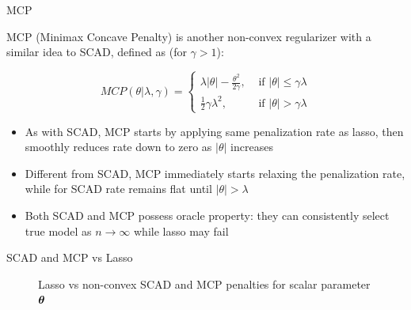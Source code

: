 \documentclass[11pt,compress,t,notes=noshow, xcolor=table]{beamer}
\begin{document}
\begin{vbframe}{MCP }

MCP ({\footnotesize{Minimax Concave Penalty}}) is another non-convex regularizer with a similar idea to SCAD, defined as (for $\gamma>1$):

$$
MCP(\theta | \lambda, \gamma)= \begin{cases}\lambda|\theta|-\frac{\theta^2}{2 \gamma}, & \text { if }|\theta| \leq \gamma \lambda \\ \frac{1}{2} \gamma \lambda^2, & \text { if }|\theta|>\gamma \lambda\end{cases}
$$
\vspace{0.3cm}
\begin{itemize}\setlength{\itemsep}{1.3em}
    \item As with SCAD, MCP starts by applying same penalization rate as lasso, then smoothly reduces rate down to zero as $|\theta|$ increases
    \item Different from SCAD, MCP immediately starts relaxing the penalization rate, while for SCAD rate remains flat until $|\theta|>\lambda$
    \item Both SCAD and MCP possess oracle property: they can consistently select true model as $n \to \infty$ while lasso may fail
\end{itemize}

\end{vbframe}

\begin{vbframe}{SCAD and MCP vs Lasso}

\begin{figure}
      \centering
        \caption{\footnotesize Lasso vs non-convex SCAD and MCP penalties for scalar parameter $\bm{\theta}$}
    \end{figure}
\end{vbframe}

\endlecture
\end{document}
